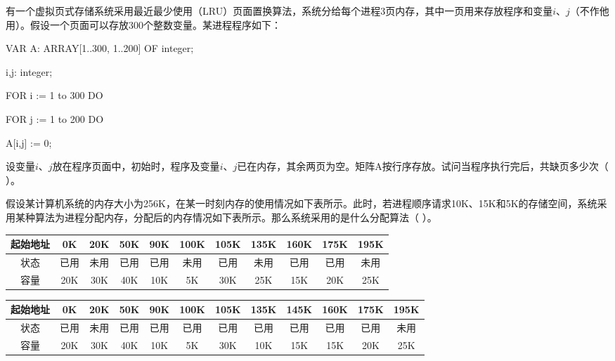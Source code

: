 \begin{qitems}[startnum=1]
\begin{bbox}
\qitem 有一个虚拟页式存储系统采用最近最少使用（LRU）页面置换算法，系统分给每个进程3页内存，其中一页用来存放程序和变量$i$、$j$（不作他用）。假设一个页面可以存放300个整数变量。某进程程序如下：\par
{\ttfamily\small
VAR A: ARRAY[1..300, 1..200] OF integer;\par
i,j: integer;\par
FOR i := 1 to 300 DO\par
\quad FOR j := 1 to 200 DO\par
\qquad A[i,j] := 0;\par
}
设变量$i$、$j$放在程序页面中，初始时，程序及变量$i$、$j$已在内存，其余两页为空。矩阵A按行序存放。试问当程序执行完后，共缺页多少次（ ）。\par
{}
\end{bbox}

\begin{bbox}
\qitem 假设某计算机系统的内存大小为256K，在某一时刻内存的使用情况如下表所示。此时，若进程顺序请求10K、15K和5K的存储空间，系统采用某种算法为进程分配内存，分配后的内存情况如下表所示。那么系统采用的是什么分配算法（ ）。\par
\begin{center}\small\setlength{\tabcolsep}{3pt}
\begin{tabular}{|c|c|c|c|c|c|c|c|c|c|c|}\hline
起始地址 & 0K & 20K & 50K & 90K & 100K & 105K & 135K & 160K & 175K & 195K \\ \hline
状态 & 已用 & 未用 & 已用 & 已用 & 未用 & 已用 & 未用 & 已用 & 已用 & 未用 \\ \hline
容量 & 20K & 30K & 40K & 10K & 5K & 30K & 25K & 15K & 20K & 25K \\ \hline
\end{tabular}\par\medskip
\begin{tabular}{|c|c|c|c|c|c|c|c|c|c|c|c|}\hline
起始地址 & 0K & 20K & 50K & 90K & 100K & 105K & 135K & 145K & 160K & 175K & 195K \\ \hline
状态 & 已用 & 未用 & 已用 & 已用 & 已用 & 已用 & 已用 & 已用 & 已用 & 已用 & 未用 \\ \hline
容量 & 20K & 30K & 40K & 10K & 5K & 30K & 10K & 15K & 15K & 20K & 25K \\ \hline
\end{tabular}\end{center}
\end{bbox}


\end{qitems}
